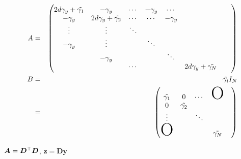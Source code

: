 \documentclass[platex, a4paper]{jsarticle}
\begin{document}
\begin{eqnarray}
  A &=& \begin{pmatrix}
  2d\gamma_y + \tilde{\gamma_1} & -\gamma_y   & \cdots & -\gamma_y   & \cdots &\\
  -\gamma_y & 2d\gamma_y + \tilde{\gamma_2} &\cdots &  \cdots &  -\gamma_y  &  \\
  \vdots&\vdots& \ddots &&& \\
  -\gamma_y &\vdots&& \ddots &&& \\
  &-\gamma_y&&& \ddots &&& \\
  &&\cdots&&& 2d\gamma_y + \tilde{\gamma_N} \\
  \end{pmatrix} \\
  B &=& \tilde {\gamma_i} I_{N} \\
    &=& \begin{pmatrix}
      \tilde{\gamma_1} & 0 & \cdots & \mbox{\Huge O}\\
      0 & \tilde{\gamma_2} & && \\
      \vdots & & \ddots \\
      \mbox{\Huge O}&&& \tilde{\gamma_N}
  \end{pmatrix}
\end{eqnarray}

$\bm{A}=\bm{D}^{\top} \bm{D}$, $\bm{z}=\bm{D}\bm{y}$
\end{document}

